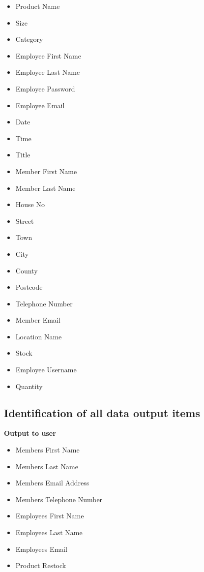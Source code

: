 \begin{itemize}
\begin{flushleft}
\begin{itemize}
\item Product Name
\item Size
\item Category
\item Employee First Name
\item Employee Last Name
\item Employee Password
\item Employee Email
\item Date
\item Time
\item Title
\item Member First Name
\item Member Last Name
\item House No
\item Street
\item Town
\item City
\item County
\item Postcode
\item Telephone Number
\item Member Email
\item Location Name
\item Stock
\item Employee Username
\item Quantity
\end{itemize}

\subsection{Identification of all data output items}

\textbf{Output to user}
\begin{itemize}
\item Members First Name
\item Members Last Name
\item Members Email Address
\item Members Telephone Number
\item Employees First Name
\item Employees Last Name
\item Employees Email
\item Product Restock
\end{itemize}


\end{flushleft}
\end{itemize}
